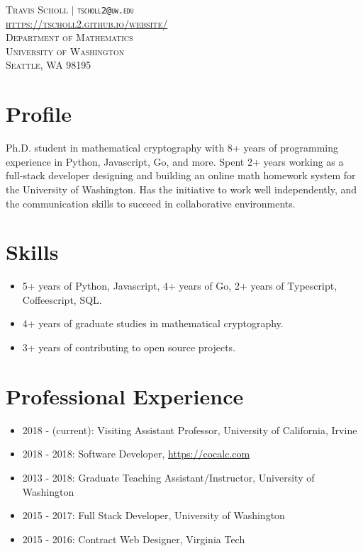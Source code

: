 \documentclass{article}
\begin{document}
	\vspace*{-1.5in}

	\begin{center}
	\textsc{
		Travis Scholl $\vert$ {\tt tscholl2@uw.edu} \\ \url{https://tscholl2.github.io/website/} \\
		Department of Mathematics \\
		University of Washington \\
		Seattle, WA 98195
	}
	\end{center}

	\section{Profile}

	Ph.D. student in mathematical cryptography with 8+ years of programming experience in Python, Javascript, Go, and more. Spent 2+ years working as a full-stack developer designing and building an online math homework system for the University of Washington. Has the initiative to work well independently, and the communication skills to succeed in collaborative environments.

	\section{Skills}

	\begin{itemize}
		\item 5+ years of Python, Javascript, 4+ years of Go, 2+ years of Typescript, Coffeescript, SQL.
		\item 4+ years of graduate studies in mathematical cryptography.
		\item 3+ years of contributing to open source projects.
	\end{itemize}

	\section{Professional Experience}

	\begin{itemize}
		\item 2018 - (current): Visiting Assistant Professor, University of California, Irvine
		\item 2018 - 2018: Software Developer, \url{https://cocalc.com}
		\item 2013 - 2018: Graduate Teaching Assistant/Instructor, University of Washington
		\item 2015 - 2017: Full Stack Developer, University of Washington
		\item 2015 - 2016: Contract Web Designer, Virginia Tech
	\end{itemize}
\end{document}
